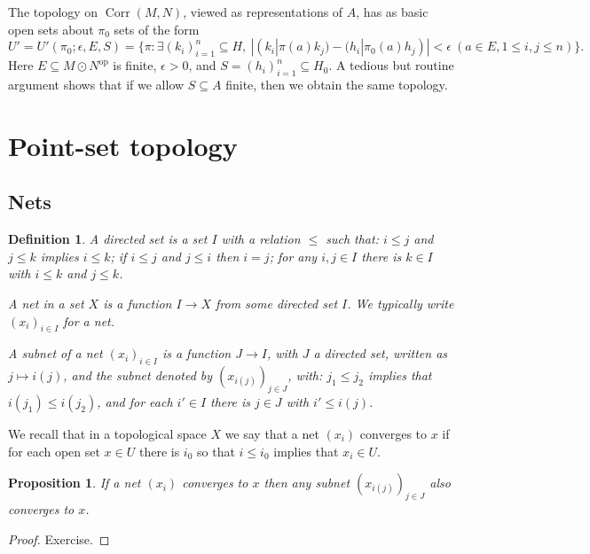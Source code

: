 \documentclass[a4paper,11pt]{article}
\newcommand{\op}{{\operatorname{op}}}
\newcommand{\Corr}{{\operatorname{Corr}}}
\newtheorem{proposition}[lemma]{Proposition}
\newtheorem{definition}[lemma]{Definition}
\begin{document}
The topology on $\Corr(M,N)$, viewed as representations of $A$, has as basic
open sets about $\pi_0$ sets of the form
\[ U' = U'(\pi_0; \epsilon, E, S)
= \big\{ \pi : \exists (k_i)_{i=1}^n\subseteq H, \ 
|(k_i|\pi(a)k_j) - (h_i|\pi_0(a)h_j)|<\epsilon \ 
(a\in E, 1\leq i,j\leq n)
\big\}. \]
Here $E\subseteq M\odot N^\op$ is finite, $\epsilon>0$, and
$S=(h_i)_{i=1}^n \subseteq H_0$.  A tedious but routine argument shows that if
we allow $S\subseteq A$ finite, then we obtain the same topology.





\appendix
\section{Point-set topology}\label{app:one}

\subsection{Nets}

\begin{definition}
A \emph{directed set} is a set $I$ with a relation $\leq$ such that:
$i\leq j$ and $j\leq k$ implies $i\leq k$; if $i\leq j$ and $j\leq i$ then
$i=j$; for any $i,j\in I$ there is $k\in I$ with $i\leq k$ and $j\leq k$.

A \emph{net} in a set $X$ is a function $I\rightarrow X$ from some directed
set $I$.  We typically write $(x_i)_{i\in I}$ for a net.

A \emph{subnet} of a net $(x_i)_{i\in I}$ is a function $J\rightarrow I$,
with $J$ a directed set, written as $j\mapsto i(j)$, and the subnet denoted
by $(x_{i(j)})_{j\in J}$, with: $j_1\leq j_2$ implies that $i(j_1)\leq i(j_2)$,
and for each $i'\in I$ there is $j\in J$ with $i'\leq i(j)$.
\end{definition}

We recall that in a topological space $X$ we say that a net $(x_i)$ converges
to $x$ if for each open set $x\in U$ there is $i_0$ so that $i\leq i_0$ implies
that $x_i\in U$.

\begin{proposition}
If a net $(x_i)$ converges to $x$ then any subnet $(x_{i(j)})_{j\in J}$
also converges to $x$.
\end{proposition}
\begin{proof}
Exercise.
\end{proof}
\end{document}
